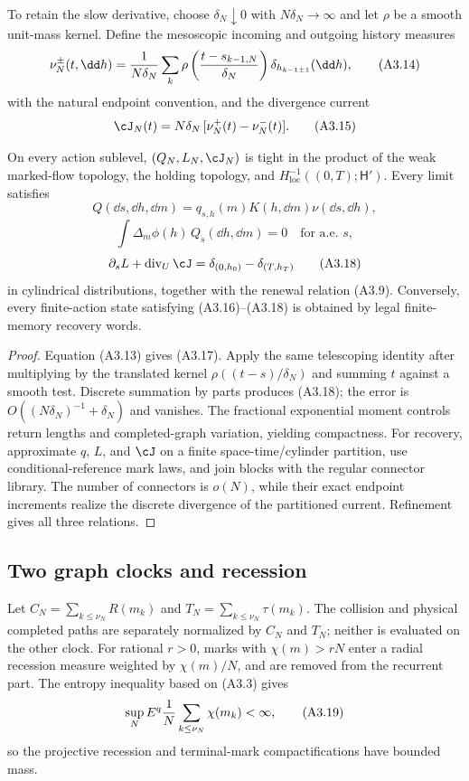 To retain the slow derivative, choose $\delta_N\downarrow0$ with
$N\delta_N\to\infty$ and let $\rho$ be a smooth unit-mass kernel.  Define the
mesoscopic incoming and outgoing history measures
\[
 \nu_N^\pm(t,\dd h)=
 {1\over N\delta_N}\sum_k
 \rho\left({t-s_{k-1,N}\over\delta_N}\right)
 \delta_{h_{k-1\pm1}}(\dd h),                             \tag{A3.14}
\]
with the natural endpoint convention, and the divergence current
\[
 \cJ_N(t)=N\delta_N\,[\nu_N^+(t)-\nu_N^-(t)].             \tag{A3.15}
\]

\begin{theorem}
\label{thm:r31-a3-two-scale}
On every action sublevel, $(Q_N,L_N,\cJ_N)$ is tight in the product of the
weak marked-flow topology, the holding topology, and
$H^{-1}_{\mathrm{loc}}((0,T);\mathsf H')$.  Every limit satisfies
\[
 Q(\dd s,\dd h,\dd m)=q_{s,h}(m)K(h,\dd m)\nu(\dd s,\dd h),             \tag{A3.16}
\]
\[
 \int\Delta_m\phi(h)\,Q_s(\dd h,\dd m)=0
 \quad\text{for a.e. }s,                                 \tag{A3.17}
\]
\[
 \partial_sL+\operatorname{div}_{U}\cJ
 =\delta_{(0,h_0)}-\delta_{(T,h_T)}                       \tag{A3.18}
\]
in cylindrical distributions, together with the renewal relation (A3.9).
Conversely, every finite-action state satisfying (A3.16)--(A3.18) is obtained
by legal finite-memory recovery words.
\end{theorem}

\begin{proof}
Equation (A3.13) gives (A3.17).  Apply the same telescoping identity after
multiplying by the translated kernel
$\rho((t-s)/\delta_N)$ and summing $t$ against a smooth test.  Discrete
summation by parts produces (A3.18); the error is
$O((N\delta_N)^{-1}+\delta_N)$ and vanishes.  The fractional exponential
moment controls return lengths and completed-graph variation, yielding
compactness.  For recovery, approximate $q$, $L$, and $\cJ$ on a finite
space-time/cylinder partition, use conditional-reference mark laws, and join
blocks with the regular connector library.  The number of connectors is
$o(N)$, while their exact endpoint increments realize the discrete divergence
of the partitioned current.  Refinement gives all three relations.
\end{proof}

\subsection{Two graph clocks and recession}

Let $C_N=\sum_{k\le\nu_N}R(m_k)$ and
$T_N=\sum_{k\le\nu_N}\tau(m_k)$.  The collision and physical completed paths
are separately normalized by $C_N$ and $T_N$; neither is evaluated on the
other clock.  For rational $r>0$, marks with $\chi(m)>rN$ enter a radial
recession measure weighted by $\chi(m)/N$, and are removed from the recurrent
part.  The entropy inequality based on (A3.3) gives
\[
 \sup_N E^q{1\over N}\sum_{k\le\nu_N}\chi(m_k)<\infty,   \tag{A3.19}
\]
so the projective recession and terminal-mark compactifications have bounded
mass.

